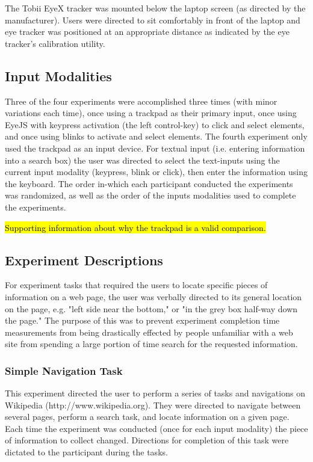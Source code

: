 \documentclass{sigchi}
\begin{document}
The Tobii EyeX tracker was mounted below 
the laptop screen (as directed by the manufacturer). Users were
directed to sit comfortably in front of the laptop and eye tracker was 
positioned at an appropriate distance as indicated by the eye tracker's 
calibration utility. 


\subsection{Input Modalities}
Three of the four experiments were accomplished three times (with 
minor variations each time), once using a trackpad as their
primary input, once using EyeJS with keypress activation (the 
left control-key) to click and select elements, and once using 
blinks to activate and select elements. The fourth experiment 
only used the trackpad as an input device. For textual input (i.e. 
entering information into a search box) the user was directed to 
select the text-inputs using the current input modality (keypress, 
blink or click), then enter the information using the keyboard. 
The order in-which each participant conducted the experiments was 
randomized, as well as the order of the inputs modalities
used to complete the experiments. 

\hl{Supporting information about why the trackpad is a valid 
comparison.}


\subsection{Experiment Descriptions}
For experiment tasks that required the users to locate specific pieces
of information on a web page, the user was verbally directed to its
general location on the page, e.g. "left side near the bottom," or
"in the grey box half-way down the page." The purpose of this was to
prevent experiment completion time measurements from being drastically
effected by people unfamiliar with a web site from spending a large 
portion of time search for the requested information.

\subsubsection{Simple Navigation Task}
This experiment directed the user to perform a series of tasks and 
navigations on Wikipedia (http://www.wikipedia.org). They were directed
to navigate between several pages, perform a search task, and locate
information on a given page. Each time the experiment was conducted (once
for each input modality) the piece of information to collect changed.
Directions for completion of this task were dictated to the participant
during the tasks.
\end{document}
